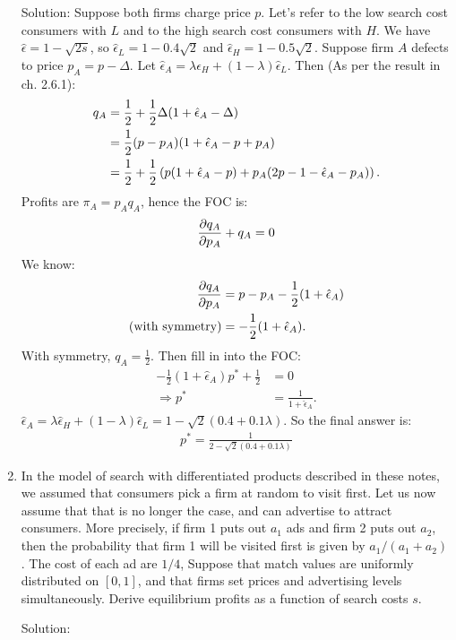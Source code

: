 \begin{enumerate}
	      Solution: Suppose both firms charge price $p$. Let's refer to
	      the low search cost consumers with $L$ and to the
	      high search cost consumers with $H$. We have
	      $\hat\epsilon=1-\sqrt{2s}$, so
	      $\hat\epsilon_L=1-0.4\sqrt{2}$ and
	      $\hat\epsilon_H=1-0.5\sqrt{2}$. Suppose firm $A$ defects to price
	      $p_A=p-\Delta$. Let
	      $\hat\epsilon_A=\lambda\hat\epsilon_H+(1-\lambda)\hat\epsilon_L$.
	      Then (As per the result in ch. 2.6.1):
	      \begin{align*}
		      q_A & = \frac{1}{2}+\frac{1}{2}\Delta(1+\hat\epsilon_A-\Delta)                          \\
		          & = \frac{1}{2}(p-p_A)(1+\hat\epsilon_A-p+p_A)                                      \\
		          & = \frac{1}{2}+\frac{1}{2}\left(p(1+\hat\epsilon_A-p)+p_A(2p-1-\hat\epsilon_A-p_A)\right).
	      \end{align*}
	      Profits are $\pi_A=p_Aq_A$, hence the FOC is:
	      \begin{align*}
		      \frac{\partial q_A}{\partial p_A}+q_A=0
	      \end{align*}
	      We know:
	      \begin{align*}
		      \frac{\partial q_A}{\partial p_A}        & = p-p_A-\frac{1}{2}(1+\hat\epsilon_A) \\
		      (\text{with symmetry}) & = -\frac{1}{2}(1+\hat\epsilon_A).
	      \end{align*}
	      With symmetry, $q_A=\frac{1}{2}$. Then fill in into the FOC:
	      \begin{align*}
		      -\frac{1}{2}(1+\hat\epsilon_A)p^*+\frac{1}{2} & =0                           \\
		      \Longrightarrow p^*                           & =\frac{1}{1+\hat\epsilon_A}.
	      \end{align*}
	      $\hat\epsilon_A=\lambda\hat\epsilon_H+(1-\lambda)\hat\epsilon_L
		      =1-\sqrt{2}(0.4+0.1\lambda)$.
	      So the final answer is:
	      \begin{align*}
		      p^*=\frac{1}{2-\sqrt{2}(0.4+0.1\lambda)}
	      \end{align*}
	\item In the model of search with differentiated products described in these notes, we
	      assumed that consumers pick a firm at random to visit first. Let us now assume that
	      that is no longer the case, and can advertise to attract consumers. More precisely,
	      if firm 1 puts out $a_1$ ads and firm 2 puts out $a_2$, then the probability that firm 1
	      will be visited first is given by $a_1/(a_1 + a_2)$. The cost of each ad are $1/4$,
	      Suppose that match values are uniformly distributed on $[0,1]$, and that firms set
	      prices and advertising levels simultaneously. Derive equilibrium profits as a function
	      of search costs $s$.

	      Solution:
\end{enumerate}
